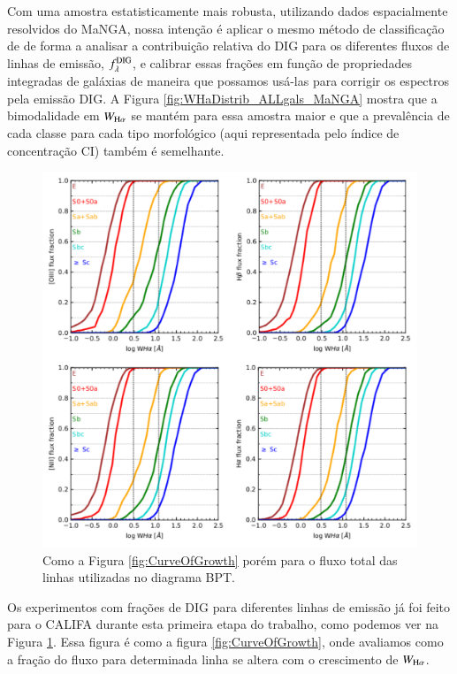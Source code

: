 Com uma amostra estatisticamente mais robusta, utilizando dados espacialmente resolvidos do MaNGA, nossa intenção é aplicar o mesmo método de classificação de \citet[][Apêndice \ref{apendice:DIGpaper0}]{Lacerda.etal.2018} de forma a analisar a contribuição relativa do DIG para os diferentes fluxos de linhas de emissão, $f_\lambda^{\rm DIG}$, e calibrar essas frações em função de propriedades integradas de galáxias de maneira que possamos usá-las para corrigir os espectros pela emissão DIG. A Figura \ref{fig:WHaDistrib_ALLgals_MaNGA} mostra que a bimodalidade em $W_{\Ha}$ se mantém para essa amostra maior e que a prevalência de cada classe para cada tipo morfológico (aqui representada pelo índice de concentração CI) também é semelhante.

\begin{figure}
	\centering
	\includegraphics{figuras/bptlines_fracDIG.pdf}
	\caption[Contribuição de DIG para os fluxos das linhas do BPT]
	{Como a Figura \ref{fig:CurveOfGrowth} porém para o fluxo total das linhas utilizadas no diagrama BPT.}
	\label{fig:bptlines_fracDIG}
\end{figure}

Os experimentos com frações de DIG para diferentes linhas de emissão já foi feito para o CALIFA durante esta primeira etapa do trabalho, como podemos ver na Figura \ref{fig:bptlines_fracDIG}. Essa figura é como a figura \ref{fig:CurveOfGrowth}, onde avaliamos como a fração do fluxo para determinada linha se altera com o crescimento de $W_{\Ha}$.

